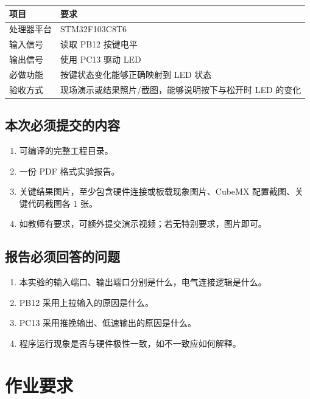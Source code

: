 \documentclass[
  chinese,
  UTF8,
  oneside,
  openany]{ctexbook}
\providecommand{\tightlist}{%
  \setlength{\itemsep}{0pt}\setlength{\parskip}{0pt}}
\begin{document}
\begin{longtable}[]{@{}ll@{}}
\toprule\noalign{}
项目 & 要求 \\
\midrule\noalign{}
\endhead
\bottomrule\noalign{}
\endlastfoot
处理器平台 & STM32F103C8T6 \\
输入信号 & 读取 PB12 按键电平 \\
输出信号 & 使用 PC13 驱动 LED \\
必做功能 & 按键状态变化能够正确映射到 LED 状态 \\
验收方式 & 现场演示或结果照片/截图，能够说明按下与松开时 LED 的变化 \\
\end{longtable}

\subsection{本次必须提交的内容}\label{ux672cux6b21ux5fc5ux987bux63d0ux4ea4ux7684ux5185ux5bb9}

\begin{enumerate}
\def\labelenumi{\arabic{enumi}.}
\tightlist
\item
  可编译的完整工程目录。
\item
  一份 PDF 格式实验报告。
\item
  关键结果图片，至少包含硬件连接或板载现象图片、CubeMX
  配置截图、关键代码截图各 1 张。
\item
  如教师有要求，可额外提交演示视频；若无特别要求，图片即可。
\end{enumerate}

\subsection{报告必须回答的问题}\label{ux62a5ux544aux5fc5ux987bux56deux7b54ux7684ux95eeux9898}

\begin{enumerate}
\def\labelenumi{\arabic{enumi}.}
\tightlist
\item
  本实验的输入端口、输出端口分别是什么，电气连接逻辑是什么。
\item
  PB12 采用上拉输入的原因是什么。
\item
  PC13 采用推挽输出、低速输出的原因是什么。
\item
  程序运行现象是否与硬件极性一致，如不一致应如何解释。
\end{enumerate}

\section{作业要求}\label{ux4f5cux4e1aux8981ux6c42}
\end{document}
